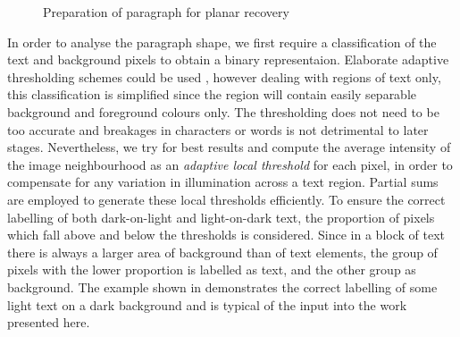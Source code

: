\begin{figure}[h]
\begin{centering}
  \hspace*{1mm}
  \hspace*{1mm}
\label{runprep}
\caption{Preparation of paragraph for planar recovery}
\end{centering}
\end{figure}

In order to analyse the paragraph shape, we first require a classification of
the text and background pixels to obtain a binary representaion. Elaborate adaptive 
thresholding schemes could be used \cite{kittler86,sahoo88}, however dealing with 
regions of text only, this
classification is simplified since the region will contain
easily separable background and foreground colours only. The thresholding does not
need to be too accurate and breakages in characters or words is not detrimental
to later stages. Nevertheless, we try for best results and  compute the average
intensity of the image neighbourhood as an {\em adaptive local threshold}
for each pixel, in
order to compensate for any variation in illumination across a text region.
Partial sums \cite{partialSums} are employed to generate these local thresholds
efficiently.  To ensure the correct labelling of both dark-on-light and
light-on-dark text, the proportion of pixels which fall above and below the
thresholds is considered.  Since in a block of text there is always a larger
area of background than of text elements, the group of pixels with the lower
proportion is labelled as text, and the other group as background.  The example
shown in  demonstrates the correct labelling of some light text
on a dark background and is typical of the input into the work presented here.


